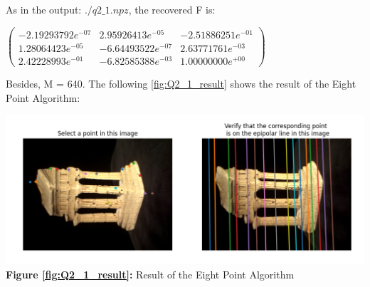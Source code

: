 \begin{your_solution}[title=Q2.1,height=23.2cm,width=\linewidth]
As in the output: $./q2\_1.npz$, the recovered F is: 
\newline

$\begin{pmatrix}
	-2.19293792e^{-07} &  2.95926413e^{-05} & -2.51886251e^{-01} \\
	1.28064423e^{-05}  & -6.64493522e^{-07} &  2.63771761e^{-03} \\
	2.42228993e^{-01}  & -6.82585388e^{-03} &  1.00000000e^{+00}
\end{pmatrix}$
\newline

Besides, M = 640.
\newline
The following \autoref{fig:Q2_1_result} shows the result of the Eight Point Algorithm:
\newline
\begin{minipage}{1\linewidth}
	\centering
	\includegraphics[width=1\linewidth, height=0.39\columnwidth]{../Q2_1_result.png}
	\textbf{Figure \ref{fig:Q2_1_result}:} Result of the Eight Point Algorithm  %
	\label{fig:Q2_1_result}         %
\end{minipage}
\newline


\end{your_solution}
